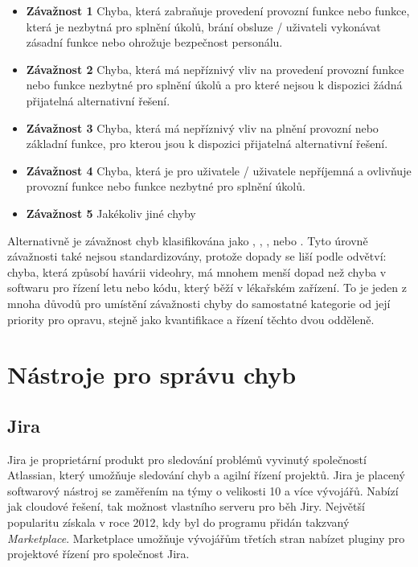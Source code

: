 \documentclass[czech,DP]{thesiskiv}
\begin{document}
\begin{itemize}
\item \textbf{Závažnost 1} Chyba, která zabraňuje provedení provozní funkce nebo funkce, která je nezbytná pro splnění úkolů, brání obsluze / uživateli vykonávat zásadní funkce nebo ohrožuje bezpečnost personálu.

\item \textbf{Závažnost 2} Chyba, která má nepříznivý vliv na provedení provozní funkce nebo funkce nezbytné pro splnění úkolů a pro které nejsou k dispozici žádná přijatelná alternativní řešení.

\item \textbf{Závažnost 3} Chyba, která má nepříznivý vliv na plnění provozní nebo základní funkce, pro kterou jsou k dispozici přijatelná alternativní řešení.

\item \textbf{Závažnost 4} Chyba, která je pro uživatele / uživatele nepříjemná a ovlivňuje provozní funkce nebo funkce nezbytné pro splnění úkolů.

\item \textbf{Závažnost 5} Jakékoliv jiné chyby
\end{itemize}

Alternativně je závažnost chyb klasifikována jako , , ,  nebo . Tyto úrovně závažnosti také nejsou standardizovány, protože dopady se liší podle odvětví: chyba, která způsobí havárii videohry, má mnohem menší dopad než chyba v softwaru pro řízení letu nebo kódu, který běží v lékařském zařízení. To je jeden z mnoha důvodů pro umístění závažnosti chyby do samostatné kategorie od její priority pro opravu, stejně jako kvantifikace a řízení těchto dvou odděleně.


\chapter{Nástroje pro správu chyb}
\section{Jira}
Jira je proprietární produkt pro sledování problémů vyvinutý společností Atlassian\citep{jirabugtracking}, který umožňuje sledování chyb a agilní řízení projektů. Jira je placený softwarový nástroj se zaměřením na týmy o velikosti 10 a více vývojářů. Nabízí jak cloudové řešení, tak možnost vlastního serveru pro běh Jiry. Největší popularitu získala v roce 2012, kdy byl do programu přidán takzvaný \textit{Marketplace}. Marketplace umožňuje vývojářům třetích stran nabízet pluginy pro projektové řízení pro společnost Jira. 
\end{document}
